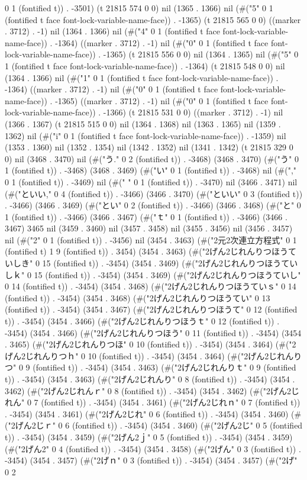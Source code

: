 0 1 (fontified t)) . -3501) (t 21815 574 0 0) nil (1365 . 1366) nil (#("5" 0 1 (fontified t face font-lock-variable-name-face)) . -1365) (t 21815 565 0 0) ((marker . 3712) . -1) nil (1364 . 1366) nil (#("4" 0 1 (fontified t face font-lock-variable-name-face)) . -1364) ((marker . 3712) . -1) nil (#("0" 0 1 (fontified t face font-lock-variable-name-face)) . -1365) (t 21815 556 0 0) nil (1364 . 1365) nil (#("5" 0 1 (fontified t face font-lock-variable-name-face)) . -1364) (t 21815 548 0 0) nil (1364 . 1366) nil (#("1" 0 1 (fontified t face font-lock-variable-name-face)) . -1364) ((marker . 3712) . -1) nil (#("0" 0 1 (fontified t face font-lock-variable-name-face)) . -1365) ((marker . 3712) . -1) nil (#("0" 0 1 (fontified t face font-lock-variable-name-face)) . -1366) (t 21815 531 0 0) ((marker . 3712) . -1) nil (1366 . 1367) (t 21815 515 0 0) nil (1364 . 1368) nil (1363 . 1365) nil (1359 . 1362) nil (#("i" 0 1 (fontified t face font-lock-variable-name-face)) . -1359) nil (1353 . 1360) nil (1352 . 1354) nil (1342 . 1352) nil (1341 . 1342) (t 21815 329 0 0) nil (3468 . 3470) nil (#("う." 0 2 (fontified t)) . -3468) (3468 . 3470) (#("う" 0 1 (fontified t)) . -3468) (3468 . 3469) (#("い" 0 1 (fontified t)) . -3468) nil (#("," 0 1 (fontified t)) . -3469) nil (#(" " 0 1 (fontified t)) . -3470) nil (3466 . 3471) nil (#("といい," 0 4 (fontified t)) . -3466) (3466 . 3470) (#("といい" 0 3 (fontified t)) . -3466) (3466 . 3469) (#("とい" 0 2 (fontified t)) . -3466) (3466 . 3468) (#("と" 0 1 (fontified t)) . -3466) (3466 . 3467) (#("ｔ" 0 1 (fontified t)) . -3466) (3466 . 3467) 3465 nil (3459 . 3460) nil (3457 . 3458) nil (3455 . 3456) nil (3456 . 3457) nil (#("2" 0 1 (fontified t)) . -3456) nil (3454 . 3463) (#("2元2次連立方程式" 0 1 (fontified t) 1 9 (fontified t)) . 3454) (3454 . 3463) (#("2げん2じれんりつほうていしき" 0 15 (fontified t)) . -3454) (3454 . 3469) (#("2げん2じれんりつほうていしｋ" 0 15 (fontified t)) . -3454) (3454 . 3469) (#("2げん2じれんりつほうていし" 0 14 (fontified t)) . -3454) (3454 . 3468) (#("2げん2じれんりつほうていｓ" 0 14 (fontified t)) . -3454) (3454 . 3468) (#("2げん2じれんりつほうてい" 0 13 (fontified t)) . -3454) (3454 . 3467) (#("2げん2じれんりつほうて" 0 12 (fontified t)) . -3454) (3454 . 3466) (#("2げん2じれんりつほうｔ" 0 12 (fontified t)) . -3454) (3454 . 3466) (#("2げん2じれんりつほう" 0 11 (fontified t)) . -3454) (3454 . 3465) (#("2げん2じれんりつほ" 0 10 (fontified t)) . -3454) (3454 . 3464) (#("2げん2じれんりつｈ" 0 10 (fontified t)) . -3454) (3454 . 3464) (#("2げん2じれんりつ" 0 9 (fontified t)) . -3454) (3454 . 3463) (#("2げん2じれんりｔ" 0 9 (fontified t)) . -3454) (3454 . 3463) (#("2げん2じれんり" 0 8 (fontified t)) . -3454) (3454 . 3462) (#("2げん2じれんｒ" 0 8 (fontified t)) . -3454) (3454 . 3462) (#("2げん2じれん" 0 7 (fontified t)) . -3454) (3454 . 3461) (#("2げん2じれｎ" 0 7 (fontified t)) . -3454) (3454 . 3461) (#("2げん2じれ" 0 6 (fontified t)) . -3454) (3454 . 3460) (#("2げん2じｒ" 0 6 (fontified t)) . -3454) (3454 . 3460) (#("2げん2じ" 0 5 (fontified t)) . -3454) (3454 . 3459) (#("2げん2ｊ" 0 5 (fontified t)) . -3454) (3454 . 3459) (#("2げん2" 0 4 (fontified t)) . -3454) (3454 . 3458) (#("2げん" 0 3 (fontified t)) . -3454) (3454 . 3457) (#("2げｎ" 0 3 (fontified t)) . -3454) (3454 . 3457) (#("2げ" 0 2 